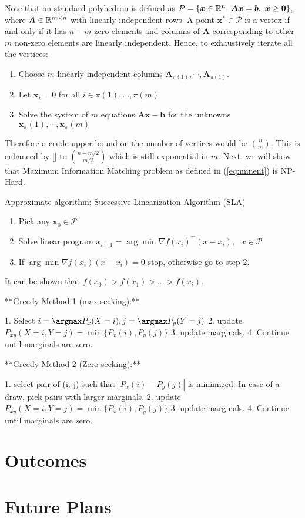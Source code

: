 Note that an standard polyhedron is defined as $\mathcal{P}=\{\bm{x} \in \mathbb{R}^n | \ \bm{A}\bm{x} = \bm{b}, \ \bm{x} \geq \bm{0}\}$, where $\bm{A} \in \mathbb{R} ^{m \times n}$ with linearly independent rows. A point $\bm{x}^* \in \mathcal{P}$ is a vertex if and only if it has $n-m$ zero elements and columns of $\bm{A}$ corresponding to other $m$ non-zero elements are linearly independent. Hence, to exhaustively iterate all the vertices:
\begin{enumerate}
    \item Choose $m$ linearly independent columns $\bm{A}_{\pi(1)}, \cdots, \bm{A}_{\pi(1)}$.
    \item Let $\bm{x}_i= 0$ for all  $i \in \pi(1),..., \pi(m)$
    \item Solve the system of $m$ equations $\bm{A}\bm{x} - \bm{b}$ for the unknowns $\bm{x}_\pi(1), \cdots, \bm{x}_\pi(m)$
\end{enumerate}

Therefore a crude upper-bound on the number of vertices would be ${n \choose m}$. This is enhanced by [] to ${n-m/2 \choose m/2}$ which is still exponential in $m$. Next, we will show that Maximum Information Matching problem as defined in (\ref{eq:minent}) is NP-Hard.


Approximate algorithm: Successive Linearization Algorithm (SLA)
\begin{enumerate}
    \item Pick any $\bm{x}_0 \in \mathcal{P}$
    \item Solve linear program $x_{i+1} = \arg\min \nabla f(x_i)^{\top}(x-x_i), \ \ \ x \in \mathcal{P}$
    \item If $\arg\min \nabla f(x_i)(x-x_i) = 0$ stop, otherwise go to step 2.
\end{enumerate}

It can be shown that $f(x_0) > f(x_1) > … >f(x_i)$.

**Greedy Method 1 (max-seeking):**

1. Select $i = \argmax P_x(X=i),  j=\argmax P_y(Y=j)$
2. update $P_{xy}(X=i, Y=j) = \min\{P_x(i), P_y(j)\}$
3. update marginals.
4. Continue until marginals are zero.

**Greedy Method 2 (Zero-seeking):**

1. select pair of (i, j) such that $|P_x(i)-P_y(j)|$ is minimized. In case of a draw, pick pairs with larger marginals.
2. update $P_{xy}(X=i, Y=j) = \min\{P_x(i), P_y(j)\}$
3. update marginals.
4. Continue until marginals are zero.




\section{Outcomes}

\section{Future Plans}


